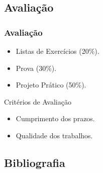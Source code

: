 \documentclass[
	10pt, %
	t, %
]{beamer}
\begin{document}
\subsection{Avaliação}

\begin{frame}
	\frametitle{Avaliação}

	\begin{itemize}
		\item Listas de Exercícios (20\%).
		\item Prova (30\%).
		\item Projeto Prático (50\%).
	\end{itemize}

	\begin{block}{Critérios de Avaliação}
		\begin{itemize}
			\item Cumprimento dos prazos.
			\item Qualidade dos trabalhos.
		\end{itemize}
	\end{block}

\end{frame}

\subsection{Bibliografia}
\end{document}
